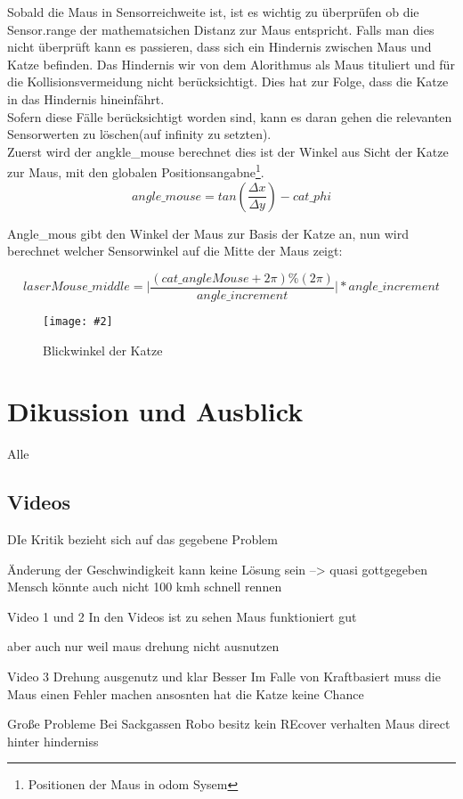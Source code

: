 \documentclass[
a4paper,     %
12pt         %
]{scrartcl}  %
\newcommand{\mygraphics}[3]{
\begin{figure}[!h]
  \begin{center}
    \texttt{[image: \#2]} \\
    \caption{#3}\label{fig:#2}
  \end{center}
\end{figure}

}
\begin{document}
Sobald die Maus in Sensorreichweite ist, ist es wichtig zu überprüfen ob die Sensor.range der mathematsichen Distanz zur Maus entspricht. Falls man dies nicht überprüft kann es passieren, dass sich ein Hindernis zwischen Maus und Katze befinden. Das Hindernis wir von dem Alorithmus als Maus tituliert und für die Kollisionsvermeidung nicht berücksichtigt. Dies hat zur Folge, dass die Katze in das Hindernis hineinfährt.\\

Sofern diese Fälle berücksichtigt worden sind, kann es daran gehen die relevanten Sensorwerten zu löschen(auf infinity zu setzten). \\

Zuerst wird der angkle\_mouse berechnet dies ist der Winkel aus Sicht der Katze zur Maus, mit den globalen Positionsangabne\footnote{Positionen der Maus in odom Sysem}.
\[ angle\_mouse=tan( \frac{\Delta x}{\Delta y} ) -cat\_phi \]

Angle\_mous gibt den Winkel der Maus zur Basis der Katze an, nun wird berechnet welcher Sensorwinkel auf die Mitte der Maus zeigt:

\[ laserMouse\_middle  =  \vert \frac{ (cat\_angleMouse + 2  \pi) \% (2 \pi)}{angle\_increment}  \vert * angle\_increment \]

\mygraphics{0.7\textwidth}{collisionANGLE2.png}{Blickwinkel der Katze}





\section{Dikussion und Ausblick}
Alle
\subsection{Videos}

DIe Kritik bezieht sich auf das gegebene Problem

Änderung der Geschwindigkeit kann keine Lösung sein --> quasi gottgegeben
Mensch könnte auch nicht 100 kmh schnell rennen

Video 1 und 2
In den Videos ist zu sehen Maus funktioniert gut

aber auch nur weil maus drehung nicht ausnutzen

Video 3
Drehung ausgenutz und klar Besser
Im Falle von Kraftbasiert muss die Maus einen Fehler machen ansosnten hat die Katze keine Chance


Große Probleme Bei Sackgassen
Robo besitz kein REcover verhalten
Maus direct hinter hinderniss
\end{document}
